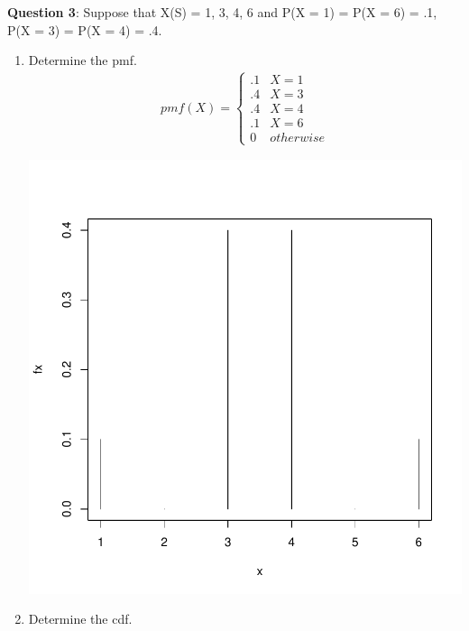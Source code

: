 \documentclass[letterpaper,12pt]{article}
\begin{document}
\begin{flushleft}
    \textbf{Question 3}: Suppose that X(S) = {1, 3, 4, 6} and P(X = 1) = P(X = 6) = .1, \\
    P(X = 3) = P(X = 4) = .4.
\end{flushleft}
\begin{enumerate}[label=(\alph*)]
    \item{Determine the pmf.} \\
        \begin{align*}
            pmf(X) = 
            \begin{cases}
                .1 & X = 1 \\
                .4 & X = 3 \\
                .4 & X = 4 \\
                .1 & X = 6 \\
                0 & otherwise
            \end{cases}
        \end{align*}
        \begin{center}
            \includegraphics{pmf.pdf}
        \end{center}
    \item{Determine the cdf.} \\
        \begin{align*}

\end{align*}
\end{enumerate}
\end{document}
